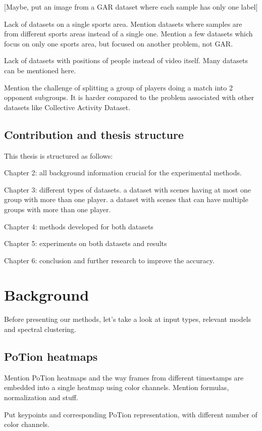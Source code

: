\documentclass[doctype=mastersthesis,lang=english,BCOR=15mm,biblatex]{ldvbook}
\begin{document}
[Maybe, put an image from a GAR dataset where each sample has only one label]

Lack of datasets on a single sports area. Mention datasets where samples are from different sports areas instead of a single one. Mention a few datasets which focus on only one sports area, but focused on another problem, not GAR.

Lack of datasets with positions of people instead of video itself. Many datasets can be mentioned here.

Mention the challenge of splitting a group of players doing a match into 2 opponent subgroups. It is harder compared to the problem associated with other datasets like Collective Activity Dataset.

\section{Contribution and thesis structure}

This thesis is structured as follows:

Chapter 2: all background information crucial for the experimental methods.

Chapter 3: different types of datasets. a dataset with scenes having at most one group with more than one player. a dataset with scenes that can have multiple groups with more than one player.

Chapter 4: methods developed for both datasets

Chapter 5: experiments on both datasets and results

Chapter 6: conclusion and further research to improve the accuracy.

\chapter{Background}

Before presenting our methods, let's take a look at input types, relevant models and spectral clustering.

\section{PoTion heatmaps}

Mention PoTion heatmaps and the way frames from different timestamps are embedded into a single heatmap using color channels. Mention formulas, normalization and stuff.

Put keypoints and corresponding PoTion representation, with different number of color channels.
\end{document}
